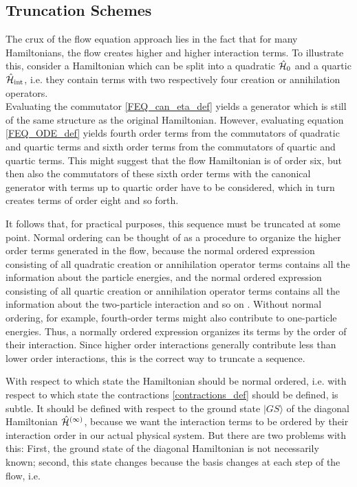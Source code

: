 \subsection{Truncation Schemes}\label{Truncation Schemes}
The crux of the flow equation approach lies in the fact that for many Hamiltonians, the flow creates higher and higher interaction terms. To illustrate this, consider a Hamiltonian which can be split into a quadratic $\hat{\mathcal{H}}_0$ and a quartic $\hat{\mathcal{H}}_{\mathrm{int}}$, i.e. they contain terms with two respectively four creation or annihilation operators. \\
Evaluating the commutator \ref{FEQ_can_eta_def} yields a generator which is still of the same structure as the original Hamiltonian. However, evaluating equation \ref{FEQ_ODE_def}  yields fourth order terms from the commutators of quadratic and quartic terms and sixth order terms from the commutators of quartic and quartic terms. This might suggest that the flow Hamiltonian is of order six, but then also the commutators of these sixth order terms with the canonical generator with terms up to quartic order have to be considered, which in turn creates terms of order eight and so forth. \par
It follows that, for practical purposes, this sequence must be truncated at some point. Normal ordering can be thought of as a procedure to organize the higher order terms generated in the flow, because the normal ordered expression consisting of all quadratic creation or annihilation operator terms contains all the information about the particle energies, and the normal ordered expression consisting of all quartic creation or annihilation operator terms contains all the information about the two-particle interaction and so on \cite{kehrein2006flow}. Without normal ordering, for example, fourth-order terms might also contribute to one-particle energies. Thus, a normally ordered expression organizes its terms by the order of their interaction. Since higher order interactions generally contribute less than lower order interactions, this is the correct way to truncate a sequence. \par
With respect to which state the Hamiltonian should be normal ordered, i.e. with respect to which state the contractions \ref{contractions_def} should be defined, is subtle. It should be defined with respect to the ground state $|GS\rangle$ of the diagonal Hamiltonian $\hat{\mathcal{H}}^{(\infty)}$, because we want the interaction terms to be ordered by their interaction order in our actual physical system. But there are two problems with this: First, the ground state of the diagonal Hamiltonian is not necessarily known; second, this state changes because the basis changes at each step of the flow, i.e. 
